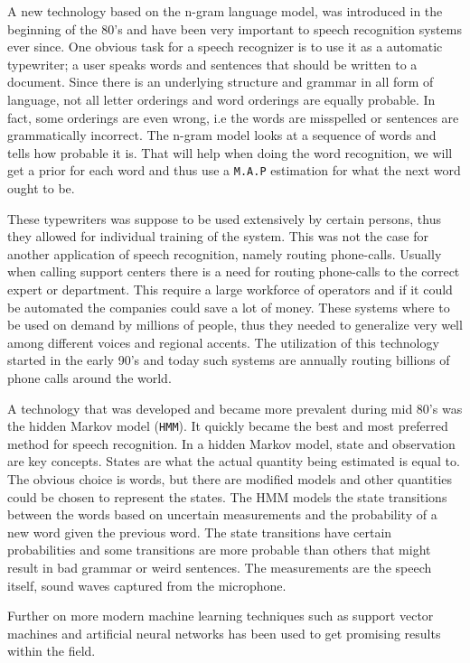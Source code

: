 \documentclass[a4paper,12pt,twoside]{ltxdoc}
\begin{document}
A new technology based on the n-gram language model, was introduced in the beginning of the 80's and have been very important to speech recognition systems ever since. One obvious task for a speech recognizer is to use it as a automatic typewriter; a user speaks words and sentences that should be written to a document. Since there is an underlying structure and grammar in all form of language, not all letter orderings and word orderings are equally probable. In fact, some orderings are even wrong, i.e the words are misspelled or sentences are grammatically incorrect. The n-gram model looks at a sequence of words and tells how probable it is. That will help when doing the word recognition, we will get a prior for each word and thus use a \verb#M.A.P# estimation for what the next word ought to be.

These typewriters was suppose to be used extensively by certain persons, thus they allowed for individual training of the system. This was not the case for another application of speech recognition, namely routing phone-calls. Usually when calling support centers there is a need for routing phone-calls to the correct expert or department. This require a large workforce of operators and if it could be automated the companies could save a lot of money. These systems where to be used on demand by millions of people, thus they needed to generalize very well among different voices and regional accents. The utilization of this technology started in the early 90's and today such systems are annually routing billions of phone calls around the world. 

A technology that was developed and became more prevalent during mid 80's was the hidden Markov model (\verb#HMM#). It quickly became the best and most preferred method for speech recognition. In a hidden Markov model, state and observation are key concepts. States are what the actual quantity being estimated is equal to. The obvious choice is words, but there are modified models and other quantities could be chosen to represent the states. The HMM models the state transitions between the words based on uncertain measurements and the probability of a new word given the previous word. The state transitions have certain probabilities and some transitions are more probable than others that might result in bad grammar or weird sentences.  The measurements are the speech itself, sound waves captured from the microphone\cite{history}.

Further on more modern machine learning techniques such as support vector machines and artificial neural networks has been used to get promising results within the field.
\end{document}
